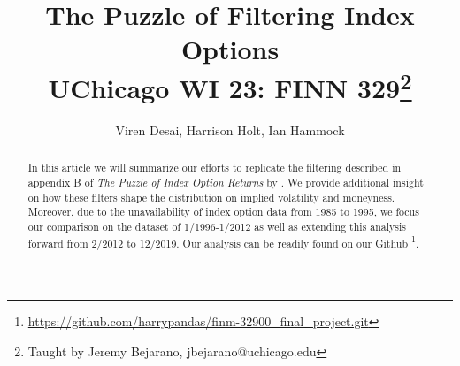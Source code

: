 \newcommand*{\MyHeaderPath}{.}%
\newcommand*{\PathToAssets}{../assets}%
\newcommand*{\PathToOutput}{../output/}%
\newcommand*{\PathToBibFile}{bibliography.bib}%








\title{
The Puzzle of Filtering Index Options
\\{\color{blue} \large UChicago WI 23: FINN 329\footnote{Taught by Jeremy Bejarano, jbejarano@uchicago.edu }}
}

\author{
Viren Desai, Harrison Holt, Ian Hammock 
}
\begin{titlepage}
% 
\maketitle


\doublespacing
\begin{abstract}
In this article we will summarize our efforts to replicate the filtering described in appendix B of \textit{The Puzzle of Index Option Returns} by \citet{constantinides2013}. We provide additional insight on how these filters shape the distribution on implied volatility and moneyness. Moreover, due to the unavailability of index option data from 1985 to 1995, we focus our comparison on the dataset of 1/1996-1/2012 as well as extending this analysis forward from 2/2012 to 12/2019. Our analysis can be readily found on our \href{https://github.com/harrypandas/finm-32900_final_project.git}{Github} \footnote{ \url{https://github.com/harrypandas/finm-32900_final_project.git} }.  


\end{abstract}


\end{titlepage}

